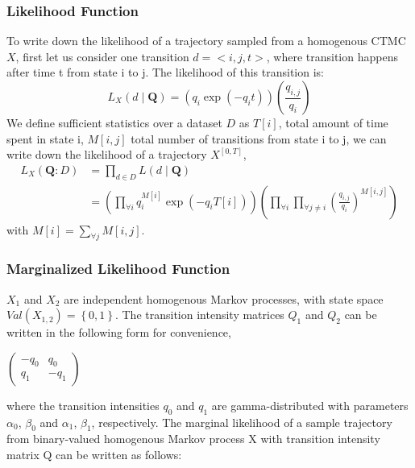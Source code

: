\subsubsection{Likelihood Function}
To write down the likelihood of a trajectory sampled from a homogenous CTMC $ X $, first let us consider one transition $ d = <i,j,t> $, where transition happens after time t from state i to j. The likelihood of this transition is:
\begin{equation}
L_{X}(d \mid \textbf{Q})=\left(q_{i} \exp \left(-q_{i} t\right)\right)\left(\frac{q_{i,j}}{q_{i}}\right)
\end{equation}
We define sufficient statistics over a dataset $ D $ as $ T[i] $, total amount of time spent in state i, $ M[i,j] $ total number of transitions from state i to j, we can write down the likelihood of a trajectory $  X^{\left[0,T\right] } $,
\begin{equation}
\begin{split}
L_{X}(\textbf{Q} : D) &=  \prod_{d \in D} L(d \mid \textbf{Q}) \\&=\left(\prod_{\forall i} q_{i}^{M[i]} \exp \left(-q_{i} T[i]\right)\right)\left(\prod_{\forall i} \prod_{\forall j \neq i} \left(\frac{q_{i,j}}{q_{i}}\right)^{M\left[i, j\right]}\right)
\label{eq:lh_traj_homo}
\end{split}
\end{equation}
with $ M[i] = \sum_{\forall j} M[i, j] $.

\subsubsection{Marginalized Likelihood Function}

$ X_{1} $ and $ X_{2} $ are independent homogenous Markov processes, with state space $ Val(X_{1, 2}) = \left\lbrace 0, 1 \right\rbrace $. The transition intensity matrices $ Q_{1} $ and $ Q_{2} $ can be written in the following form for convenience,
\begin{center}
	\begin{math}
	\begin{pmatrix}
	-q_{0} & q_{0} \\
	q_{1} & -q_{1}
	\end{pmatrix}
	\end{math}\\
\end{center}
where the transition intensities $ q_{0} $ and $ q_{1} $ are gamma-distributed with parameters $ \alpha_{0}$, $ \beta_{0} $ and $ \alpha_{1} $, $ \beta_{1} $, respectively. The marginal likelihood of a sample trajectory from binary-valued homogenous Markov process X with transition intensity matrix Q can be written as follows:

